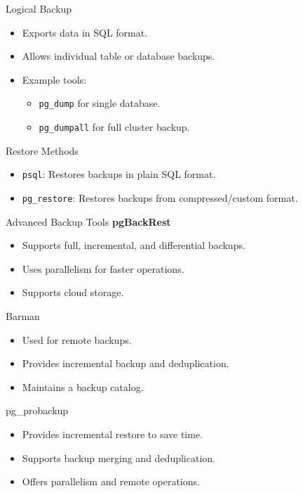 \documentclass{beamer}
\begin{document}
\begin{frame}{Logical Backup}
    \begin{itemize}
        \item Exports data in SQL format.
        \item Allows individual table or database backups.
        \item Example tools:
        \begin{itemize}
            \item \texttt{pg\_dump} for single database.
            \item \texttt{pg\_dumpall} for full cluster backup.
        \end{itemize}
    \end{itemize}
\end{frame}

\begin{frame}{Restore Methods}
    \begin{itemize}
        \item \texttt{psql}: Restores backups in plain SQL format.
        \item \texttt{pg\_restore}: Restores backups from compressed/custom format.
    \end{itemize}
\end{frame}

\begin{frame}{Advanced Backup Tools}
    \textbf{pgBackRest}
    \begin{itemize}
        \item Supports full, incremental, and differential backups.
        \item Uses parallelism for faster operations.
        \item Supports cloud storage.
    \end{itemize}
\end{frame}

\begin{frame}{Barman}
    \begin{itemize}
        \item Used for remote backups.
        \item Provides incremental backup and deduplication.
        \item Maintains a backup catalog.
    \end{itemize}
\end{frame}

\begin{frame}{pg\_probackup}
    \begin{itemize}
        \item Provides incremental restore to save time.
        \item Supports backup merging and deduplication.
        \item Offers parallelism and remote operations.
    \end{itemize}
\end{frame}
\end{document}

